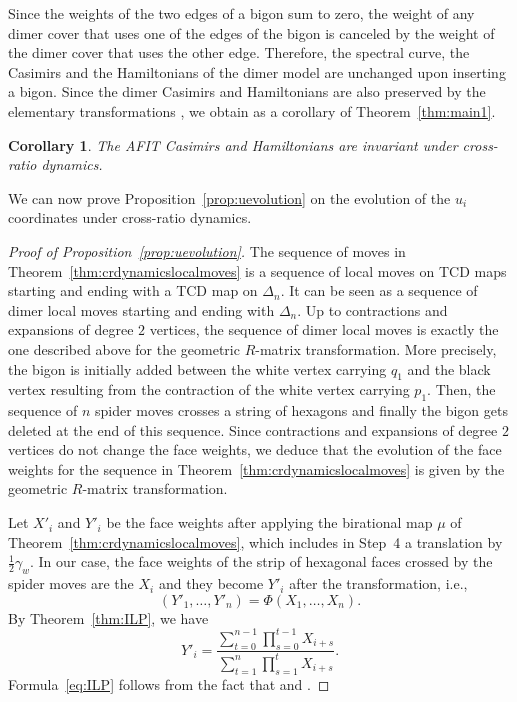 \documentclass[10pt,a4paper]{amsart}
\numberwithin{equation}{section}
\newtheorem{Corollary}[Theorem]{Corollary}
\begin{document}
Since the weights of the two edges of a bigon sum to zero, the weight of any dimer cover that uses one of the edges of the bigon is canceled by the weight of the dimer cover that uses the other edge. Therefore, the spectral curve, the Casimirs and the Hamiltonians of the dimer model are unchanged upon inserting a bigon. Since the dimer Casimirs and Hamiltonians are also preserved by the elementary transformations \cite[Theorem~4.7]{GK13}, we obtain as a corollary of Theorem~\ref{thm:main1}.

	\begin{Corollary}\label{cor:alternative}
		The AFIT Casimirs and Hamiltonians are invariant under cross-ratio dy\-namics.
	\end{Corollary}
	
	We can now prove Proposition~\ref{prop:uevolution} on the evolution of the $u_i$ coordinates under cross-ratio dynamics.
	
	\begin{proof}[Proof of Proposition~\ref{prop:uevolution}]
		
		The sequence of moves in Theorem~\ref{thm:crdynamicslocalmoves} is a sequence of local moves on TCD maps starting and ending with a TCD map on $\Delta_n$. It can be seen as a sequence of dimer local moves starting and ending with $\Delta_n$. Up to contractions and expansions of degree $2$ vertices, the sequence of dimer local moves is exactly the one described above for the geometric $R$-matrix transformation. More precisely, the bigon is initially added between the white vertex carrying $q_1$ and the black vertex resulting from the contraction of the white vertex carrying $p_1$. Then, the sequence of $n$ spider moves crosses a string of hexagons and finally the bigon gets deleted at the end of this sequence. Since contractions and expansions of degree $2$ vertices do not change the face weights, we deduce that the evolution of the face weights for the sequence in Theorem~\ref{thm:crdynamicslocalmoves} is given by the geometric $R$-matrix transformation.
		
		Let $X'_i$ and $Y'_i$ be the face weights after applying the birational map $\mu$ of Theorem~\ref{thm:crdynamicslocalmoves}, which includes in Step~4 a translation by $\tfrac{1}{2}\gamma_w$. In our case, the face weights of the strip of hexagonal faces crossed by the spider moves are the $X_i$ and they become $Y'_i$ after the transformation, i.e.,
		\[
		(Y'_1,\dots,Y'_n)=\Phi(X_1,\dots,X_n).
		\]
		By Theorem~\ref{thm:ILP}, we have
		\[
			Y'_i=\frac{\sum\limits_{t=0}^{n-1}\prod\limits_{s=0}^{t-1}X_{i+s}}{\sum\limits_{t=1}^{n}\prod\limits_{s=1}^{t}X_{i+s}}.
		\]
		Formula~\eqref{eq:ILP} follows from the fact that  and .
	\end{proof}
	
\end{document}
